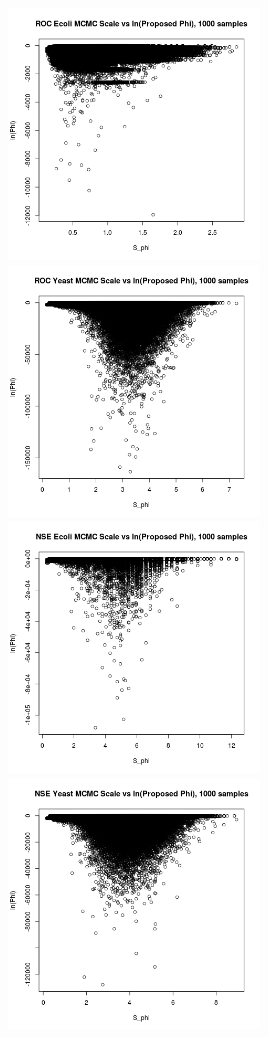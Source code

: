 \includegraphics[width=0.5\textwidth]{data/S_Phi-vs-lnPhi-RocEcoli-1000.png}
\includegraphics[width=0.5\textwidth]{data/S_Phi-vs-lnPhi-RocYeast-1000.png}
\includegraphics[width=0.5\textwidth]{data/S_Phi-vs-lnPhi-NseEcoli-1000.png}
\includegraphics[width=0.5\textwidth]{data/S_Phi-vs-lnPhi-NseYeast-1000.png}




